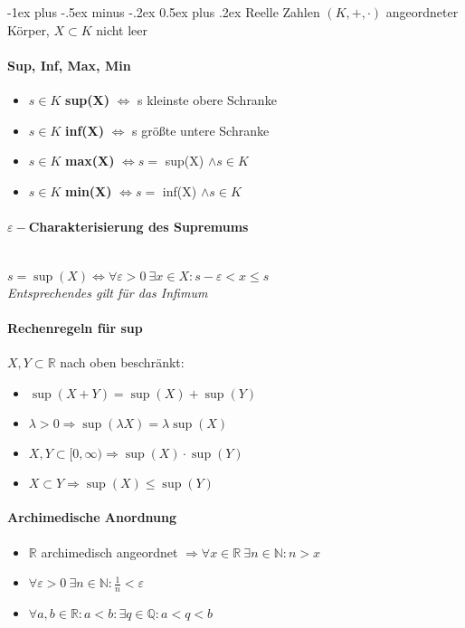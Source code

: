 \documentclass[paper=a3,paper=landscape, fontsize=9pt, DIV=30]{scrartcl}
\makeatletter
\newcommand{\real}{{\mathbb{R}}}
\newcommand{\nat}{\mathbb{N}}
\renewcommand{\section}{\@startsection{section}{1}{0mm}%
  {-1ex plus -.5ex minus -.2ex}%
  {0.5ex plus .2ex}%
  {\color{blue}\normalfont\large\bfseries}}
\makeatother
\begin{document}
\begin{multicols*}{4}
	\section{Reelle Zahlen}
	$(K,+,\cdot)$ angeordneter Körper, $X \subset K$ nicht leer
	\paragraph{Sup, Inf, Max, Min}
	\begin{itemize}
		\item $s \in K$ \textbf{sup(X)} $\Leftrightarrow$ s kleinste obere Schranke
		\item $s \in K$ \textbf{inf(X)} $\Leftrightarrow$ s größte untere Schranke
		\item $s \in K$ \textbf{max(X)} $\Leftrightarrow s =$ sup(X) $\wedge s \in K$
		\item $s \in K$ \textbf{min(X)} $\Leftrightarrow s =$ inf(X) $\wedge s \in K$
	\end{itemize}
	\paragraph{$\varepsilon-$Charakterisierung des Supremums}\hspace{0pt}\\
	$s = \sup(X) \Leftrightarrow\forall \varepsilon > 0 \ \exists x \in X: s-\varepsilon < x \leq s$\\
	\textit{Entsprechendes gilt für das Infimum}
	\paragraph{Rechenregeln für sup}
	$X,Y \subset \real$ nach oben beschränkt:
	\begin{itemize}
		\item $\sup(X+Y) = \sup(X) + \sup(Y)$
		\item $\lambda > 0 \Rightarrow \sup(\lambda X) = \lambda \sup(X)$
		\item $X,Y \subset [0,\infty) \Rightarrow \sup(X) \cdot \sup(Y)$
		\item $X \subset Y \Rightarrow \sup(X) \leq \sup(Y)$
	\end{itemize}
\paragraph{Archimedische Anordnung}
\begin{itemize}
	\item $\real$ archimedisch angeordnet $\Rightarrow \forall x \in \real \ \exists n \in \nat: n > x$
	\item $\forall \varepsilon > 0 \ \exists n \in \nat: \frac{1}{n} < \varepsilon$
	\item $\forall a,b \in \real: a < b: \exists q \in \mathbb{Q}: a<q<b$
\end{itemize}


\end{multicols*}
\end{document}
